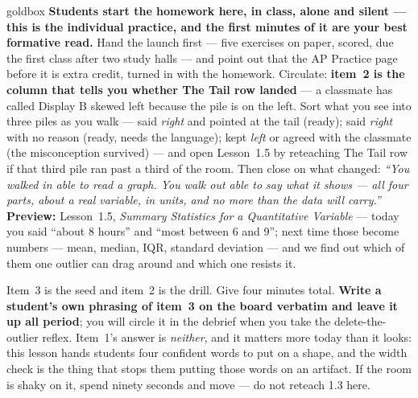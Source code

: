\documentclass[10pt]{article}
\begin{document}
\boxguard
\begin{skillbox}{goldbox}
\textbf{Students start the homework here, in class, alone and silent --- this is the individual
practice, and the first minutes of it are your best formative read.} Hand the launch first ---
five exercises on paper, scored, due the first class after two study halls --- and point out
that the AP Practice page before it is extra credit, turned in with the homework. Circulate:
\textbf{item~2 is the column that tells you whether The Tail row landed} --- a classmate has called
Display B skewed left because the pile is on the left. Sort what you see into three piles as you
walk --- said \emph{right} and pointed at the tail (ready); said \emph{right} with no reason
(ready, needs the language); kept \emph{left} or agreed with the classmate (the misconception
survived) --- and open Lesson~1.5 by reteaching The Tail row if that third pile
ran past a third of the room. Then close on what changed: \emph{``You walked in able to read a
graph. You walk out able to say what it shows --- all four parts, about a real variable, in
units, and no more than the data will carry.''} \textbf{Preview:} Lesson~1.5, \emph{Summary
Statistics for a Quantitative Variable} --- today you said ``about 8 hours'' and ``most between
6 and 9''; next time those become numbers --- mean, median, IQR, standard deviation --- and we
find out which of them one outlier can drag around and which one resists it.
\end{skillbox}

\begin{teachernote}[Warm-Up]
Item~3 is the seed and item~2 is the drill. Give four minutes total. \textbf{Write a student's
own phrasing of item~3 on the board verbatim and leave it up all period}; you will circle it in
the debrief when you take the delete-the-outlier reflex. Item~1's answer is \emph{neither}, and
it matters more today than it looks: this lesson hands students four confident words to put on a
shape, and the width check is the thing that stops them putting those words on an artifact.
If the room is shaky on it, spend ninety seconds and move --- do not reteach 1.3 here.
\end{teachernote}
\end{document}
